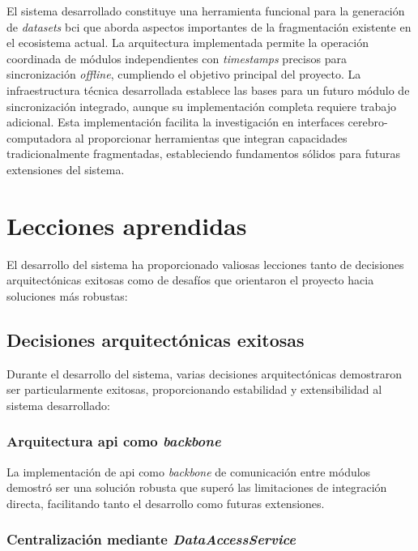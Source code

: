 El sistema desarrollado constituye una herramienta funcional para la generación de \textit{\glspl{dataset}} \acrshort{bci} que aborda aspectos importantes de la fragmentación existente en el ecosistema actual. La arquitectura implementada permite la operación coordinada de módulos independientes con \textit{\glspl{timestamp}} precisos para sincronización \textit{offline}, cumpliendo el objetivo principal del proyecto. La infraestructura técnica desarrollada establece las bases para un futuro módulo de sincronización integrado, aunque su implementación completa requiere trabajo adicional. Esta implementación facilita la investigación en interfaces cerebro-computadora al proporcionar herramientas que integran capacidades tradicionalmente fragmentadas, estableciendo fundamentos sólidos para futuras extensiones del sistema.

\section{Lecciones aprendidas}
\label{sec:lecciones_aprendidas}

El desarrollo del sistema ha proporcionado valiosas lecciones tanto de decisiones arquitectónicas exitosas como de desafíos que orientaron el proyecto hacia soluciones más robustas:

\subsection{Decisiones arquitectónicas exitosas}
\label{subsec:decisiones_exitosas}

Durante el desarrollo del sistema, varias decisiones arquitectónicas demostraron ser particularmente exitosas, proporcionando estabilidad y extensibilidad al sistema desarrollado:

\subsubsection{Arquitectura \acrshort{api} como \textit{\gls{backbone}}}
\label{subsubsec:arquitectura_api_backbone}

La implementación de \acrshort{api} como \textit{\gls{backbone}} de comunicación entre módulos demostró ser una solución robusta que superó las limitaciones de integración directa, facilitando tanto el desarrollo como futuras extensiones.

\subsubsection{Centralización mediante \textit{\textbf{DataAccessService}}}
\label{subsubsec:centralizacion_dataaccess}

